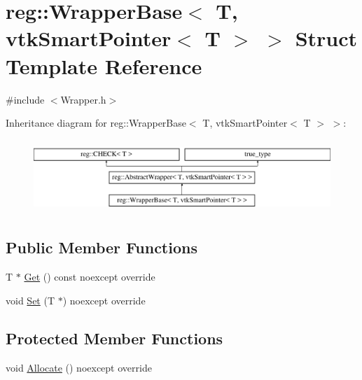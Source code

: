 \hypertarget{structreg_1_1_wrapper_base_3_01_t_00_01vtk_smart_pointer_3_01_t_01_4_01_4}{}\section{reg\+:\+:Wrapper\+Base$<$ T, vtk\+Smart\+Pointer$<$ T $>$ $>$ Struct Template Reference}
\label{structreg_1_1_wrapper_base_3_01_t_00_01vtk_smart_pointer_3_01_t_01_4_01_4}


{\ttfamily \#include $<$Wrapper.\+h$>$}

Inheritance diagram for reg\+:\+:Wrapper\+Base$<$ T, vtk\+Smart\+Pointer$<$ T $>$ $>$\+:\begin{figure}[H]
\begin{center}
\leavevmode
\includegraphics[height=2.800000cm]{structreg_1_1_wrapper_base_3_01_t_00_01vtk_smart_pointer_3_01_t_01_4_01_4}
\end{center}
\end{figure}
\subsection*{Public Member Functions}
\begin{DoxyCompactItemize}
\item 
T $\ast$ \hyperlink{structreg_1_1_wrapper_base_3_01_t_00_01vtk_smart_pointer_3_01_t_01_4_01_4_a61bd745924ef0582ee61ae174ed7479f}{Get} () const noexcept override
\item 
void \hyperlink{structreg_1_1_wrapper_base_3_01_t_00_01vtk_smart_pointer_3_01_t_01_4_01_4_aa066a74ca5abf0e13fd3ed62f0508e32}{Set} (T $\ast$) noexcept override
\end{DoxyCompactItemize}
\subsection*{Protected Member Functions}
\begin{DoxyCompactItemize}
\item 
void \hyperlink{structreg_1_1_wrapper_base_3_01_t_00_01vtk_smart_pointer_3_01_t_01_4_01_4_a3b2609bc1666d9f2dbfe789100889bdc}{Allocate} () noexcept override
\end{DoxyCompactItemize}
